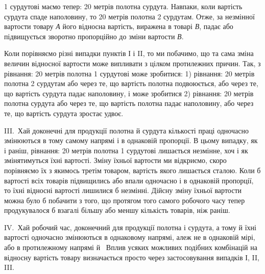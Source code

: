 \parcont{}  %
1 сурдутові маємо тепер: 20 метрів полотна \deq{}  сурдута. Навпаки,
коли вартість сурдута спаде наполовину, то 20 метрів полотна
\deq{} 2 сурдутам. Отже, за незмінної вартости товару \emph{А} його
відносна вартість, виражена в товарі \emph{В}, падає або підвищується
зворотно пропорційно до зміни вартости \emph{В}.

Коли порівняємо різні випадки пунктів І і II, то ми побачимо,
що та сама зміна величин відносної вартости може випливати з
цілком протилежних причин. Так, з рівнання: 20 метрів полотна
\deq{} 1 сурдутові може зробитися: 1) рівнання: 20 метрів
полотна \deq{} 2 сурдутам або через те, що вартість полотна подвоюється,
або через те, що вартість сурдута падає наполовину, і
може зробитися 2) рівнання: 20 метрів полотна \deq{}  сурдута
або через те, що вартість полотна падає наполовину, або через те,
що вартість сурдута зростає удвоє.

III.~Хай доконечні для продукції полотна й сурдута кількості
праці одночасно змінюються в тому самому напрямі і в однаковій
пропорції. В цьому випадку, як і раніш, рівнання: 20 метрів
полотна \deq{} 1 сурдутові лишається незмінне, хоч і як змінятимуться
їхні вартості. Зміну їхньої вартости ми відкриємо, скоро
порівняємо їх з якимось третім товаром, вартість якого лишається
сталою. Коли б вартості всіх товарів підвищились або впали
одночасно і в однаковій пропорції, то їхні відносні вартості лишилися
б незмінні. Дійсну зміну їхньої вартости можна було б
побачити з того, що протягом того самого робочого часу тепер
продукувалося б взагалі більшу або меншу кількість товарів,
ніж раніш.

IV.~Хай робочий час, доконечний для продукції полотна і
сурдута, а тому й їхні вартості одночасно змінюються в однаковому
напрямі, алеж не в однаковій мірі, або в протилежному
напрямі й~ Вплив усяких можливих подібних комбінацій
на відносну вартість товару визначається просто через застосовування
випадків І, II, III.

